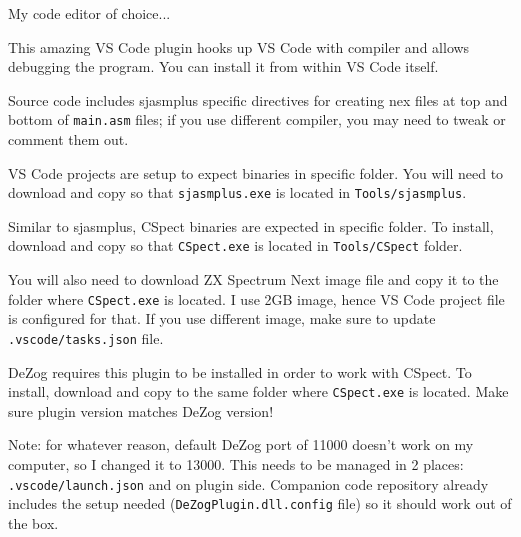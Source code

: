\documentclass[12pt,twoside,openright,a4paper]{book}
\begin{document}
\begin{description}[style=unboxed,leftmargin=0cm]
	\item[Visual Studio Code (\url{https://code.visualstudio.com/})]\hfill
	
	My code editor of choice...

	\item[DeZog plugin (\url{https://github.com/maziac/DeZog})]\hfill
	
	This amazing VS Code plugin hooks up VS Code with compiler and allows debugging the program. You can install it from within VS Code itself.

	\item[sjasmplus 1.18.2 (\url{https://github.com/z00m128/sjasmplus})]\hfill

	Source code includes sjasmplus specific directives for creating nex files at top and bottom of {\tt main.asm} files; if you use different compiler, you may need to tweak or comment them out.

	VS Code projects are setup to expect binaries in specific folder. You will need to download and copy so that {\tt sjasmplus.exe} is located in {\tt Tools/sjasmplus}.

	\item[CSpect 2.13.0 (\url{http://cspect.org})]\hfill

	Similar to sjasmplus, CSpect binaries are expected in specific folder. To install, download and copy so that {\tt CSpect.exe} is located in {\tt Tools/CSpect} folder.

	\item[CSpect Next Image (\url{http://www.zxspectrumnext.online/#sd})]\hfill

	You will also need to download ZX Spectrum Next image file and copy it to the folder where {\tt CSpect.exe} is located. I use 2GB image, hence VS Code project file is configured for that. If you use different image, make sure to update {\tt .vscode/tasks.json} file.
	
	\item[DeZog CSpect plugin (\url{https://github.com/maziac/DeZogPlugin})]\hfill

	DeZog requires this plugin to be installed in order to work with CSpect. To install, download and copy to the same folder where {\tt CSpect.exe} is located. Make sure plugin version matches DeZog version!

	{\footnotesize Note: for whatever reason, default DeZog port of 11000 doesn't work on my computer, so I changed it to 13000. This needs to be managed in 2 places: {\tt .vscode/launch.json} and on plugin side. Companion code repository already includes the setup needed ({\tt DeZogPlugin.dll.config} file) so it should work out of the box.}

\end{description}
\end{document}
